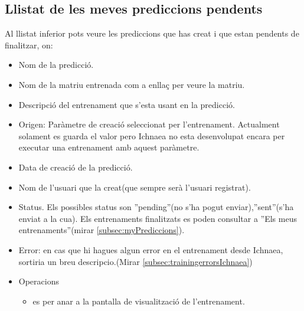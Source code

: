 \subsection{Llistat de les meves prediccions pendents}
Al llistat inferior pots veure les prediccions que has creat i que estan pendents de finalitzar, on: 
\begin{itemize}
\item Nom de la predicció.
\item Nom de la matriu entrenada com a enllaç per veure la matriu.
\item Descripci\'{o} del entrenament que s'esta usant en la predicció.
\item Origen: Paràmetre de creació seleccionat per l'entrenament. Actualment solament es guarda el valor pero Ichnaea no esta desenvolupat encara per executar una entrenament amb aquest paràmetre.
\item Data de creaci\'{o} de la predicció.
\item Nom de l'usuari que la creat(que sempre serà l'usuari registrat).
\item Status. Els possibles status son ''pending''(no s'ha pogut enviar),''sent''(s'ha enviat a la cua). Els entrenaments finalitzats es poden consultar a ''Els meus entrenaments''(mirar \ref{subsec:myPrediccions}).
\item Error: en cas que hi hagues algun error en el entrenament desde Ichnaea, sortiria un breu descripcio.(Mirar \ref{subsec:trainingerrorsIchnaea})
\item Operacions
 \begin{itemize}
 \item \iconeyeopen es per anar a la pantalla de visualització de l'entrenament.
 \end{itemize}
\end{itemize}

